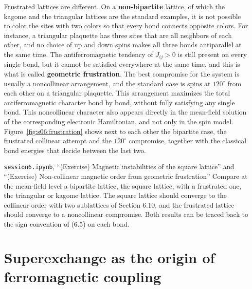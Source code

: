 Frustrated lattices are different. On a \textbf{non-bipartite} lattice, of which the kagome and the
triangular lattices are the standard examples, it is not possible to color the sites with two colors
so that every bond connects opposite colors. For instance, a triangular plaquette has three sites that
are all neighbors of each other, and no choice of up and down spins makes all three bonds antiparallel
at the same time. The antiferromagnetic tendency of $J_{ij}>0$ is still present on every single bond,
but it cannot be satisfied everywhere at the same time, and this is what is called \textbf{geometric
frustration}. The best compromise for the system is usually a noncollinear arrangement, and the
standard case is spins at $120^\circ$ from each other on a triangular plaquette. This arrangement
maximizes the total antiferromagnetic character bond by bond, without fully satisfying any single
bond. This noncollinear character also appears directly in the mean-field solution of the
corresponding electronic Hamiltonian, and not only in the spin model. Figure~\ref{fig:s06:frustration}
shows next to each other the bipartite case, the frustrated collinear attempt and the $120^\circ$
compromise, together with the classical bond energies that decide between the last two.



\begin{notebookbox}{\texttt{session6.ipynb}, ``(Exercise) Magnetic instabilities of the square lattice'' and ``(Exercise) Non-collinear magnetic order from geometric frustration''}
Compare at the mean-field level a bipartite lattice, the square lattice, with a frustrated one, the
triangular or kagome lattice. The square lattice should converge to the collinear order with two
sublattices of Section 6.10, and the frustrated lattice should converge to a noncollinear compromise.
Both results can be traced back to the sign convention of (6.5) on each bond.
\end{notebookbox}

\section{Superexchange as the origin of ferromagnetic coupling}

